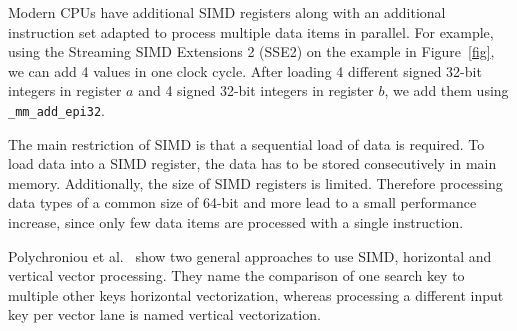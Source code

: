 \documentclass[runningheads,a4paper]{llncs}
\begin{document}
Modern CPUs have additional SIMD registers along with an additional instruction set adapted to process multiple data items in parallel. %
For example, using the Streaming SIMD Extensions 2 (SSE2) on the example in Figure~\ref{fig}, we can add 4 values in one clock cycle.
After loading 4 different signed 32-bit integers in register $a$ and 4 signed 32-bit integers in register $b$, we add them using \texttt{\_mm\_add\_epi32}. %

The main restriction of SIMD is that a sequential load of data is required. To load data into a SIMD register, the data has to be stored consecutively in main memory. Additionally, the size of SIMD registers is limited. Therefore processing data types of a common size of 64-bit and more lead to a small performance increase, since only few data items are processed with a single instruction.

Polychroniou et al.\ \cite{polychroniou2015rethinking} show two general approaches to use SIMD, horizontal and vertical vector processing. They name the comparison of one search key to multiple other keys horizontal vectorization, whereas processing a different input key per vector lane is named vertical vectorization.
\end{document}
